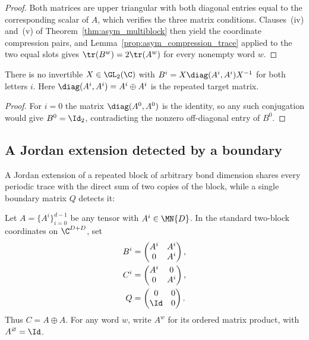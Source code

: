 \begin{proof}
    \leanok
    Both matrices are upper triangular with both diagonal entries equal to
    the corresponding scalar of $A$, which verifies the three
    matrix conditions. Clauses~(iv) and~(v) of
    Theorem~\ref{thm:asym_multiblock} then yield the coordinate
    compression pairs, and Lemma~\ref{prop:asym_compression_trace}
    applied to the two equal slots gives $\tr(B^w)=2\tr(A^w)$ for every
    nonempty word $w$.
\end{proof}

\begin{lemma}
    \label{thm:asymex_repeated_not_gauge}
    \leanok
    There is no invertible $X\in\GL_2(\C)$ with
    $B^i=X\diag(A^i,A^i)X^{-1}$ for both letters $i$.
    Here $\diag(A^i,A^i)=A^i\oplus A^i$ is the repeated target matrix.
\end{lemma}

\begin{proof}
    \leanok
    For $i=0$ the matrix $\diag(A^0,A^0)$ is the identity, so any such
    conjugation would give $B^0=\Id_2$, contradicting the nonzero
    off-diagonal entry of $B^0$.
\end{proof}

\subsection{A Jordan extension detected by a boundary}

A Jordan extension of a repeated block of arbitrary bond dimension shares
every periodic trace with the direct sum of two copies of the block, while a
single boundary matrix $Q$ detects it:

\begin{definition}
    \label{def:asymex_jordan}
    \leanok
    Let $A=\{A^i\}_{i=0}^{d-1}$ be any tensor with $A^i\in\MN{D}$.
    In the standard two-block coordinates on $\C^{D+D}$, set
    \begin{align}
        B^i & =\begin{pmatrix}A^i&A^i\\0&A^i\end{pmatrix}, \\
        C^i & =\begin{pmatrix}A^i&0\\0&A^i\end{pmatrix},   \\
        Q   & =\begin{pmatrix}0&0\\\Id&0\end{pmatrix}.
    \end{align}
    Thus $C=A\oplus A$. For any word $w$, write $A^w$ for its
    ordered matrix product, with $A^\varnothing=\Id$.
\end{definition}

